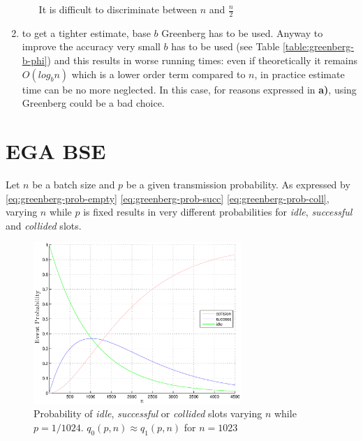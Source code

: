 \documentclass[11pt,a4paper,twoside,openright]{book}
\begin{document}
\begin{enumerate}[\bf a)]
\begin{enumerate}[\it i.]
\begin{itemize}
		\end{itemize}
		It is difficult to discriminate between $n$ and $\frac{n}{2}$ 
	\end{enumerate}
\item to get a tighter estimate, base $b$ Greenberg has to be used. Anyway to improve the accuracy very small $b$ has to be used (see Table \ref{table:greenberg-b-phi}) and this results in worse running times: even if theoretically it remains $O(log_{b}n)$ which is a lower order term compared to $n$, in practice estimate time can be no more neglected. In this case, for reasons expressed in {\bf a)}, using Greenberg  could be a bad choice.
\end{enumerate}

\section{EGA BSE}

Let $n$ be a batch size and $p$ be a given transmission probability. As expressed by \eqref{eq:greenberg-prob-empty} \eqref{eq:greenberg-prob-succ} \eqref{eq:greenberg-prob-coll}, varying $n$ while $p$ is fixed results in very different probabilities for \emph{idle}, \emph{successful} and \emph{collided} slots.

\begin{figure}[htbp]
\begin{center}
\includegraphics[width=0.7\textwidth]{matlab/Greenberg_MLE/draw_coll_idle_succ_fixed_p}
\caption[\emph{Basic Greenberg}: Event probability fixed $p$]{Probability of \emph{idle}, \emph{successful} or \emph{collided} slots varying $n$ while  $p=1/1024$.  $q_{0}(p,n) \approx  q_{1}(p,n)$ for $n=1023$}
\end{center}
\end{figure}
\end{document}
